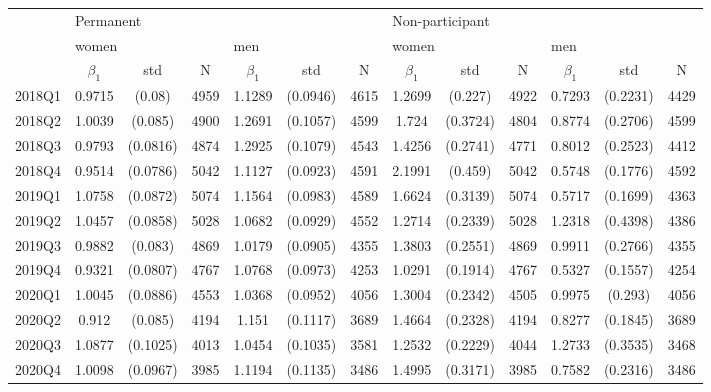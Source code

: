 \begin{tabular}{l|ccc|ccc|ccc|ccc}
\toprule
{} & \multicolumn{6}{l}{Permanent} & \multicolumn{6}{l}{Non-participant} \\
{} & \multicolumn{3}{l}{women} & \multicolumn{3}{l}{men} & \multicolumn{3}{l}{women} & \multicolumn{3}{l}{men} \\
{} & $\beta_1$ &       std &     N & $\beta_1$ &       std &     N &       $\beta_1$ &       std &     N & $\beta_1$ &       std &     N \\
\midrule
2018Q1 &    0.9715 &    (0.08) &  4959 &    1.1289 &  (0.0946) &  4615 &          1.2699 &   (0.227) &  4922 &    0.7293 &  (0.2231) &  4429 \\
2018Q2 &    1.0039 &   (0.085) &  4900 &    1.2691 &  (0.1057) &  4599 &           1.724 &  (0.3724) &  4804 &    0.8774 &  (0.2706) &  4599 \\
2018Q3 &    0.9793 &  (0.0816) &  4874 &    1.2925 &  (0.1079) &  4543 &          1.4256 &  (0.2741) &  4771 &    0.8012 &  (0.2523) &  4412 \\
2018Q4 &    0.9514 &  (0.0786) &  5042 &    1.1127 &  (0.0923) &  4591 &          2.1991 &   (0.459) &  5042 &    0.5748 &  (0.1776) &  4592 \\
2019Q1 &    1.0758 &  (0.0872) &  5074 &    1.1564 &  (0.0983) &  4589 &          1.6624 &  (0.3139) &  5074 &    0.5717 &  (0.1699) &  4363 \\
2019Q2 &    1.0457 &  (0.0858) &  5028 &    1.0682 &  (0.0929) &  4552 &          1.2714 &  (0.2339) &  5028 &    1.2318 &  (0.4398) &  4386 \\
2019Q3 &    0.9882 &   (0.083) &  4869 &    1.0179 &  (0.0905) &  4355 &          1.3803 &  (0.2551) &  4869 &    0.9911 &  (0.2766) &  4355 \\
2019Q4 &    0.9321 &  (0.0807) &  4767 &    1.0768 &  (0.0973) &  4253 &          1.0291 &  (0.1914) &  4767 &    0.5327 &  (0.1557) &  4254 \\
2020Q1 &    1.0045 &  (0.0886) &  4553 &    1.0368 &  (0.0952) &  4056 &          1.3004 &  (0.2342) &  4505 &    0.9975 &   (0.293) &  4056 \\
2020Q2 &     0.912 &   (0.085) &  4194 &     1.151 &  (0.1117) &  3689 &          1.4664 &  (0.2328) &  4194 &    0.8277 &  (0.1845) &  3689 \\
2020Q3 &    1.0877 &  (0.1025) &  4013 &    1.0454 &  (0.1035) &  3581 &          1.2532 &  (0.2229) &  4044 &    1.2733 &  (0.3535) &  3468 \\
2020Q4 &    1.0098 &  (0.0967) &  3985 &    1.1194 &  (0.1135) &  3486 &          1.4995 &  (0.3171) &  3985 &    0.7582 &  (0.2316) &  3486 \\

\end{tabular}
